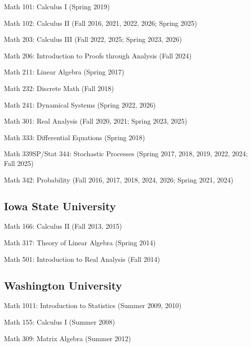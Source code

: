 \documentclass[10pt,letterpaper]{article}
\renewenvironment{itemize}{
  \begin{list}{}{
    \setlength{\leftmargin}{1.5em}
    \setlength{\itemsep}{0.25em}
    \setlength{\parskip}{0pt}
    \setlength{\parsep}{0.25em}
  }
}{
  \end{list}
}
\begin{document}
\begin{itemize}
\item
  Math 101: Calculus I (Spring 2019)
\item
  Math 102: Calculus II (Fall 2016, 2021, 2022, 2026; Spring 2025)
\item
  Math 203: Calculus III (Fall 2022, 2025; Spring 2023, 2026)
\item
  Math 206: Introduction to Proofs through Analysis (Fall 2024)
\item
  Math 211: Linear Algebra (Spring 2017)
\item
  Math 232: Discrete Math (Fall 2018)
\item
  Math 241: Dynamical Systems (Spring 2022, 2026)
\item
  Math 301: Real Analysis (Fall 2020, 2021; Spring 2023, 2025)
\item
  Math 333: Differential Equations (Spring 2018)
\item
  Math 339SP/Stat 344: Stochastic Processes (Spring 2017, 2018, 2019,
  2022, 2024; Fall 2025)
\item
  Math 342: Probability (Fall 2016, 2017, 2018, 2024, 2026; Spring 2021,
  2024)
\end{itemize}

\hypertarget{iowa-state-university}{%
\subsection*{Iowa State University}\label{iowa-state-university}}

\begin{itemize}
\item
  Math 166: Calculus II (Fall 2013, 2015)
\item
  Math 317: Theory of Linear Algebra (Spring 2014)
\item
  Math 501: Introduction to Real Analysis (Fall 2014)
\end{itemize}

\hypertarget{washington-university}{%
\subsection*{Washington University}\label{washington-university}}

\begin{itemize}
\item
  Math 1011: Introduction to Statistics (Summer 2009, 2010)
\item
  Math 155: Calculus I (Summer 2008)
\item
  Math 309: Matrix Algebra (Summer 2012)
\end{itemize}
\end{document}
